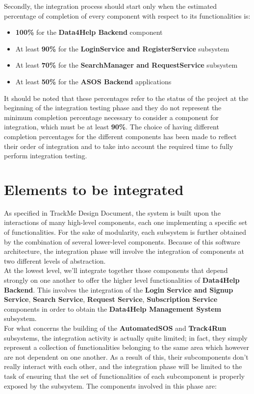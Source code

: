 \documentclass[a4paper, hidelinks, 12pt]{report}
\begin{document}
	\quad Secondly, the integration process should start only when the estimated percentage of completion of every component with respect to its functionalities is:
	\begin{itemize}
		\item{}\textbf{100\%} for the \textbf{Data4Help Backend} component
		\item{}At least \textbf{90\%} for the \textbf{LoginService and RegisterService} subsystem
		\item{}At least \textbf{70\%} for the \textbf{SearchManager and RequestService} subsystem
		\item{}At least \textbf{50\%} for the \textbf{ASOS Backend} applications
	\end{itemize}
	It should be noted that these percentages refer to the status of the project at the beginning of the integration testing phase and they do not represent the minimum completion percentage necessary to consider a component for integration, which must be at least \textbf{90\%}. The choice of having different completion percentages for the different components has been made to reflect their order of integration and to take into account the required time to fully perform integration testing.

	\section{Elements to be integrated}
	As specified in TrackMe Design Document, the system is built upon the interactions of many high-level components, each one implementing a specific set of functionalities. For the sake of modularity, each subsystem is further obtained by the combination of several lower-level components. Because of this software architecture, the integration phase will involve the integration of components at two different levels of abstraction.\\
	
	At the lowest level, we'll integrate together those components that depend strongly on one another to offer the higher level functionalities of \textbf{Data4Help Backend}. This involves the integration of the \textbf{Login Service and Signup Service}, \textbf{Search Service}, \textbf{Request Service}, \textbf{Subscription Service} components in order to obtain the \textbf{Data4Help Management System} subsystem.\\
	
	For what concerns the building of the \textbf{AutomatedSOS} and \textbf{Track4Run} subsystems, the integration activity is actually quite limited; in fact, they simply represent a collection of functionalities belonging to the same area which however are not dependent on one another. As a result of this, their subcomponents don't really interact with each other, and the integration phase will be limited to the task of ensuring that the set of functionalities of each subcomponent is properly exposed by the subsystem. The components involved in this phase are:
	
\end{document}
